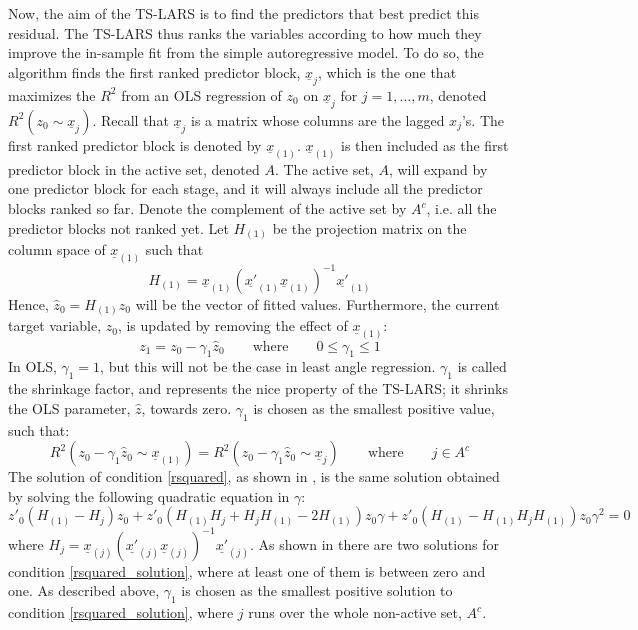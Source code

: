 Now, the aim of the TS-LARS is to find the predictors that best predict this residual. The TS-LARS thus ranks the variables according to how much they improve the in-sample fit from the simple autoregressive model. To do so, the algorithm finds the first ranked predictor block, $\underline{x}_j$, which is the one that maximizes the $R^2$ from an OLS regression of $z_0$ on $\underline{x}_j$ for $j = 1, \ldots, m$, denoted $R^2(z_0 \sim \underline{x}_j)$. Recall that $\underline{x}_j$ is a matrix whose columns are the lagged $x_j$'s. The first ranked predictor block is denoted by $\underline{x}_{(1)}$. $\underline{x}_{(1)}$ is then included as the first predictor block in the active set, denoted $A$. The active set, $A$, will expand by one predictor block for each stage, and it will always include all the predictor blocks ranked so far. Denote the complement of the active set by $A^c$, i.e. all the predictor blocks not ranked yet. Let $H_{(1)}$ be the projection matrix on the column space of $\underline{x}_{(1)}$ such that
\begin{equation}\label{projection}
	H_{(1)} = \underline{x}_{(1)} (\underline{x'}_{(1)} \underline{x}_{(1)})^{-1} \underline{x'}_{(1)}
\end{equation}
\noindent Hence, $\hat{z}_0 =  H_{(1)} z_0$ will be the vector of fitted values. Furthermore, the current target variable, $z_0$, is updated by removing the effect of $\underline{x}_{(1)}$:
\begin{equation}\label{updated_response}
	z_1 = z_0 - \gamma_1 \hat{z}_0 \quad \quad \text{where} \quad \quad 0 \leq \gamma_1 \leq 1
\end{equation}
\noindent In OLS, $\gamma_1 = 1$, but this will not be the case in least angle regression. $\gamma_1$ is called the shrinkage factor, and represents the nice property of the TS-LARS; it shrinks the OLS parameter, $\hat{z}$, towards zero. $\gamma_1$ is chosen as the smallest positive value, such that:
\begin{equation}\label{rsquared}
	R^2(z_0 - \gamma_1 \hat{z}_0 \sim \underline{x}_{(1)}) = R^2(z_0 - \gamma_1 \hat{z}_0 \sim \underline{x}_{j}) \quad \quad \text{where} \quad 				\quad j \in A^c
\end{equation}
\noindent The solution of condition \eqref{rsquared}, as shown in \textcite{gelper2008}, is the same solution obtained by solving the following quadratic equation in $\gamma$:
\begin{equation}\label{rsquared_solution}
	z'_0 (H_{(1)} - H_j) z_0 + z'_0 (H_{(1)} H_j + H_j H_{(1)} - 2 H_{(1)}) 		z_0 \gamma + z'_0 (H_{(1)} - H_{(1)} H_j H_{(1)}) z_0 \gamma^2 = 		0
\end{equation}
\noindent where $H_j = \underline{x}_{(j)} (\underline{x'}_{(j)}\underline{x}_{(j)})^{-1} \underline{x'}_{(j)}$.  As shown in \textcite{gelper2008} there are two solutions for condition \eqref{rsquared_solution}, where at least one of them is between zero and one. As described above, $\gamma_1$ is chosen as the smallest positive solution to condition \eqref{rsquared_solution}, where $j$ runs over the whole non-active set, $A^c$.

